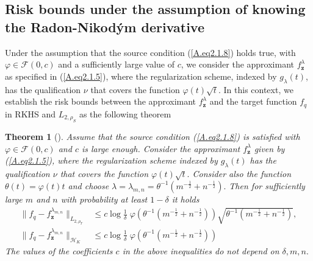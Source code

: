 \documentclass[USenglish]{article}
\newtheorem{theorem}{Theorem}[section]
\begin{document}
 \subsection{Risk bounds under the assumption of knowing the Radon-Nikod\'ym derivative}\label{sec2.3}

Under the assumption that the source condition (\ref{A.eq2.1.8}) holds true, with $\varphi \in \mathcal{F} (0,c)$ and a sufficiently large value of $c$, we consider the approximant $f_\mathbf{z}^\lambda$ as specified in (\ref{A.eq2.1.5}), where the regularization scheme, indexed by $g_\lambda (t)$, has the qualification $\nu$ that covers the function $\varphi (t) \sqrt{t}$. In this context, we establish the risk bounds between the approximant $f_\mathbf{z}^\lambda$ and the target function $f_q$ in RKHS and $L_{2,\rho_S}$ as the following theorem
\begin{theorem}[\cite{gizewski2022regularization}]
\label{A.thm2.1}
Assume that the source condition (\ref{A.eq2.1.8}) is satisfied with $\varphi \in \mathcal{F} (0,c)$ and $c$ is large enough. Consider the approximant $f_\mathbf{z}^\lambda$ given by (\ref{A.eq2.1.5}), where the regularization scheme indexed by $g_\lambda (t)$ has the qualification $\nu$ that covers the function $\varphi (t) \sqrt{t}.$ Consider also the function $\theta (t) = \varphi (t) t$ and choose $\lambda = \lambda_{m,n} = \theta^{-1} (m^{-\frac{1}{2}} + n^{-\frac{1}{2}}).$ Then for sufficiently large $m$ and $n$ with probability at least $1-\delta$ it holds 
\begin{align*}
		\|f_q - f_\mathbf{z}^{\lambda_{m,n} } \|_{L_{2,\rho_T}} &\leq c \log \frac{1}{\delta}\; \varphi (\theta^{-1} (m^{-\frac{1}{2}} + n^{-\frac{1}{2}}))\sqrt{\theta^{-1} (m^{-\frac{1}{2}} + n^{-\frac{1}{2}})}, \\
		\|f_q - f_\mathbf{z}^{\lambda_{m,n} } \|_{\mathcal{H}_K} &\leq c \log \frac{1}{\delta}\; \varphi (\theta^{-1} (m^{-\frac{1}{2}} + n^{-\frac{1}{2}}))
\end{align*}
The values of the coefficients $c$ in the above inequalities do not depend on $\delta, m, n.$
\end{theorem}
\end{document}
